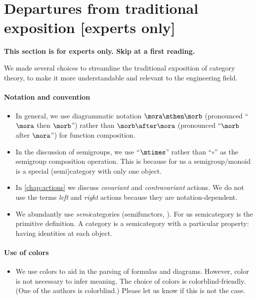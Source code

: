 
\section[Departures from tradition]{Departures from traditional exposition [experts only]}

\textbf{This section is for experts only.
    Skip at a first reading.
}

We made several choices to streamline the traditional exposition of category theory, to make it more understandable and relevant to the engineering field.

\paragraph{Notation and convention}
\begin{itemize}
    \item In general, we use diagrammatic notation $\mora \mthen \morb$ (pronounced ``$\mora$ then $\morb$'') rather than $\morb \after \mora$ (pronounced ``$\morb$ after $\mora$'') for function composition.
    \item In the discussion of semigroups, we use ``$\mtimes$'' rather than ``$\circ$'' as the semigroup composition operation.
          This is because for us a semigroup/monoid is a special (semi)category with only one object.
    \item In \cref{chap:actions} we discuss \emph{covariant} and \emph{contravariant} actions.
          We do not use the terms \emph{left} and \emph{right} actions because they are notation-dependent.
    \item We abundantly use \emph{semi}categories (semifunctors, \etc).
          For us semicategory is the primitive definition.
          A category is a semicategory with a particular property: having identities at each object.
\end{itemize}

\paragraph{Use of colors}
\begin{itemize}
    \item We use colors to aid in the parsing of formulas and diagrams.
          However, color is not necessary to infer meaning.
          The choice of colors is colorblind-friendly.
          (One of the authors is colorblind.)
          Please let us know if this is not the case.
\end{itemize}

